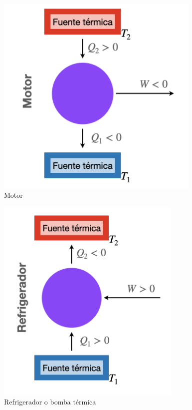\begin{minipage}{0.5\textwidth}%
\begin{figure}[H]
    \centering
    \includegraphics[width=0.87\textwidth]{img/motor_carnot.png}
    \caption{Motor}
    \label{fig:motor}
\end{figure}
\end{minipage}%
\begin{minipage}{0.5\textwidth}%
\begin{figure}[H]
    \centering
    \includegraphics[width=0.79\textwidth]{img/refrigerador.png}
    \caption{Refrigerador o bomba térmica}
    \label{fig:refrigerador}
\end{figure}
\end{minipage}%
\hfill\\

